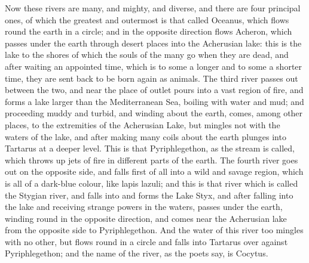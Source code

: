 Now these rivers are many, and mighty, and diverse, and there are four
principal ones, of which the greatest and outermost is that called
Oceanus, which flows round the earth in a circle; and in the opposite
direction flows Acheron, which passes under the earth through desert
places into the Acherusian lake: this is the lake to the shores of
which the souls of the many go when they are dead, and after waiting an
appointed time, which is to some a longer and to some a shorter time,
they are sent back to be born again as animals. The third river passes
out between the two, and near the place of outlet pours into a vast
region of fire, and forms a lake larger than the Mediterranean Sea,
boiling with water and mud; and proceeding muddy and turbid, and winding
about the earth, comes, among other places, to the extremities of the
Acherusian Lake, but mingles not with the waters of the lake, and after
making many coils about the earth plunges into Tartarus at a deeper
level. This is that Pyriphlegethon, as the stream is called, which
throws up jets of fire in different parts of the earth. The fourth river
goes out on the opposite side, and falls first of all into a wild and
savage region, which is all of a dark-blue colour, like lapis lazuli;
and this is that river which is called the Stygian river, and falls into
and forms the Lake Styx, and after falling into the lake and receiving
strange powers in the waters, passes under the earth, winding round
in the opposite direction, and comes near the Acherusian lake from the
opposite side to Pyriphlegethon. And the water of this river too mingles
with no other, but flows round in a circle and falls into Tartarus over
against Pyriphlegethon; and the name of the river, as the poets say, is
Cocytus.

